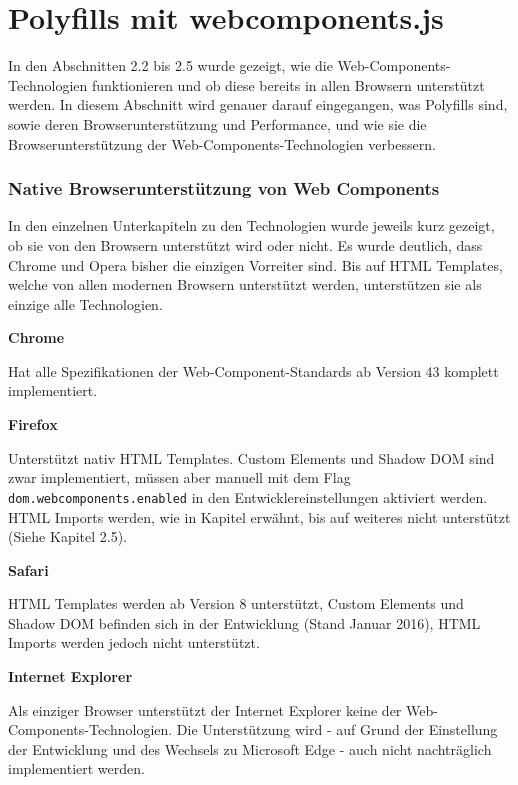 \section{Polyfills mit webcomponents.js}\label{polyfills-mit-webcomponents.js}

In den Abschnitten 2.2 bis 2.5 wurde gezeigt, wie die Web-Components-Technologien funktionieren und ob diese bereits in allen Browsern unterstützt werden. In diesem Abschnitt wird genauer darauf eingegangen, was Polyfills sind, sowie deren Browserunterstützung und Performance, und wie sie die Browserunterstützung der Web-Components-Technologien verbessern.


\subsubsection{Native Browserunterstützung von Web Components}\label{native-browserunterstuxfctzung-von-web-components}

In den einzelnen Unterkapiteln zu den Technologien wurde jeweils kurz gezeigt, ob sie von den Browsern unterstützt wird oder nicht. Es wurde deutlich, dass Chrome und Opera bisher die einzigen Vorreiter sind. Bis auf HTML Templates, welche von allen modernen Browsern unterstützt werden, unterstützen sie als einzige alle Technologien. \cite{citeulike:13914379}

\textbf{Chrome}

Hat alle Spezifikationen der Web-Component-Standards ab Version 43 komplett implementiert.

\textbf{Firefox}

Unterstützt nativ HTML Templates. Custom Elements und Shadow DOM sind zwar implementiert, müssen aber manuell mit dem Flag \texttt{dom.webcomponents.enabled} in den Entwicklereinstellungen aktiviert werden. HTML Imports werden, wie in Kapitel erwähnt, bis auf weiteres nicht unterstützt (Siehe Kapitel 2.5).

\textbf{Safari}

HTML Templates werden ab Version 8 unterstützt, Custom Elements und Shadow DOM befinden sich in der Entwicklung (Stand Januar 2016), HTML Imports werden jedoch nicht unterstützt.

\textbf{Internet Explorer}

Als einziger Browser unterstützt der Internet Explorer keine der Web-Components-Technologien. Die Unterstützung wird - auf Grund der Einstellung der Entwicklung und des Wechsels zu Microsoft Edge - auch nicht nachträglich implementiert werden.

